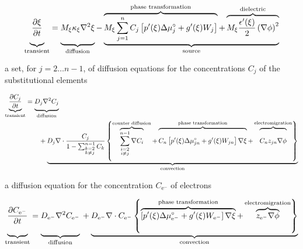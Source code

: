 \documentclass[tocAsPDFpart]{fipy}
\begin{document}
\[
    \underbrace{
	\frac{\partial \xi}{\partial t}
	\vphantom{M_{\xi}\sum_{j=1}^{n} C_j}
    }_{\text{transient}}
    = 
    \underbrace{
	M_{\xi}\kappa_{\xi}\nabla^2 \xi
	\vphantom{M_{\xi}\sum_{j=1}^{n} C_j}
    }_{\text{diffusion}}
    - 
    \underbrace{
	\overbrace{
	    M_{\xi}\sum_{j=1}^{n} C_j \left[
		p'(\xi) \Delta\mu_j^\circ
		+ g'(\xi) W_j
	    \right]
	}^{\text{phase transformation}}
	+
	\overbrace{
	    M_{\xi}\frac{\epsilon'(\xi)}{2}\left(\nabla\phi\right)^2
	}^{\text{dielectric}}
    }_{\text{source}}
\]

a set, for \( j = 2\ldots n-1 \), of diffusion equations for
the concentrations \( C_j \) of the substitutional elements

\begin{align*}
    \underbrace{
	\frac{\partial C_j}{\partial t}
    }_{\text{transient}}
    &= \underbrace{
	D_{j}\nabla^2 C_j
	\vphantom{\frac{\partial C_j}{\partial t}}
    }_{\text{diffusion}} \\
    & \qquad + \underbrace{
	D_{j}\nabla\cdot 
	\frac{C_j}{1 - \sum_{\substack{k=2\\ k \neq j}}^{n-1} C_k}
	\left\{
	    \overbrace{
		\sum_{\substack{i=2\\ i \neq j}}^{n-1} \nabla C_i
	    }^{\text{counter diffusion}}
	    + 
	    \overbrace{
		C_n \left[
		    p'(\xi) \Delta\mu_{jn}^{\circ}
		    + g'(\xi) W_{jn}
		\right] \nabla\xi
		\vphantom{\sum_{\substack{i=2\\ i \neq j}}^{n-1} \nabla C_i}
	    }^{\text{phase transformation}}
	    +
	    \overbrace{
		C_n z_{jn} \nabla \phi
		\vphantom{\sum_{\substack{i=2\\ i \neq j}}^{n-1} \nabla C_i}
	    }^{\text{electromigration}}
	\right\}
    }_{\text{convection}}
\end{align*}

a diffusion equation for the concentration \( C_{\text{e}^{-}} \) of
electrons

\[
    \underbrace{
	\frac{\partial C_{\text{e}^{-}}}{\partial t}
	\vphantom{\left\{
	    \overbrace{
		\left[p'(\xi)\right]
	    }^{\text{phase transformation}}
	\right\}}
    }_{\text{transient}}
    = \underbrace{
	D_{\text{e}^{-}}\nabla^2 C_{\text{e}^{-}}
	\vphantom{\left\{
	    \overbrace{
		\left[p'(\xi)\right]
	    }^{\text{phase transformation}}
	\right\}}
    }_{\text{diffusion}} \\
    + \underbrace{
	D_{\text{e}^{-}}\nabla\cdot 
	C_{\text{e}^{-}}
	\left\{
	    \overbrace{
		\left[
		    p'(\xi) \Delta\mu_{\text{e}^{-}}^{\circ}
		    + g'(\xi) W_{\text{e}^{-}}
		\right] \nabla\xi
	    }^{\text{phase transformation}}
	    +
	    \overbrace{
		z_{\text{e}^{-}} \nabla \phi
	    }^{\text{electromigration}}
	\right\}
    }_{\text{convection}}
\]
\end{document}
